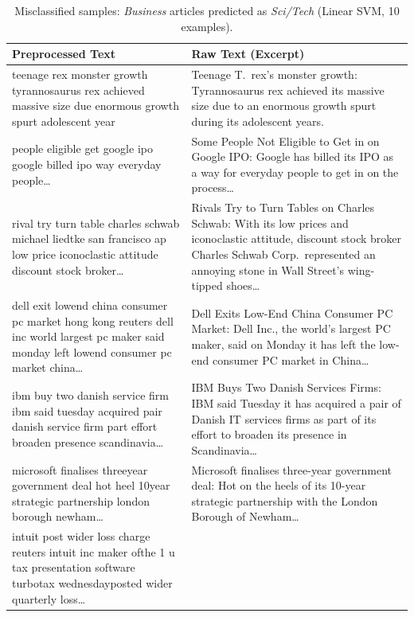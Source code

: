 
\begin{table}[htbp]
\centering
\caption{Misclassified samples: \textit{Business} articles predicted as \textit{Sci/Tech} (Linear SVM, 10 examples).}
\label{tab:error-analysis-biz-to-sci}
\small
\begin{tabular}{p{0.6\textheight} p{0.6\textheight}}
\toprule
\textbf{Preprocessed Text} & \textbf{Raw Text (Excerpt)} \\
\midrule
teenage rex monster growth tyrannosaurus rex achieved massive size due enormous growth spurt adolescent year &
Teenage T.\ rex's monster growth: Tyrannosaurus rex achieved its massive size due to an enormous growth spurt during its adolescent years. \\
\addlinespace
people eligible get google ipo google billed ipo way everyday people\ldots &
Some People Not Eligible to Get in on Google IPO: Google has billed its IPO as a way for everyday people to get in on the process\ldots \\
\addlinespace
rival try turn table charles schwab michael liedtke san francisco ap low price iconoclastic attitude discount stock broker\ldots &
Rivals Try to Turn Tables on Charles Schwab: With its low prices and iconoclastic attitude, discount stock broker Charles Schwab Corp.\ represented an annoying stone in Wall Street's wing-tipped shoes\ldots \\
\addlinespace
dell exit lowend china consumer pc market hong kong reuters dell inc world largest pc maker said monday left lowend consumer pc market china\ldots &
Dell Exits Low-End China Consumer PC Market: Dell Inc., the world's largest PC maker, said on Monday it has left the low-end consumer PC market in China\ldots \\
\addlinespace
ibm buy two danish service firm ibm said tuesday acquired pair danish service firm part effort broaden presence scandinavia\ldots &
IBM Buys Two Danish Services Firms: IBM said Tuesday it has acquired a pair of Danish IT services firms as part of its effort to broaden its presence in Scandinavia\ldots \\
\addlinespace
microsoft finalises threeyear government deal hot heel 10year strategic partnership london borough newham\ldots &
Microsoft finalises three-year government deal: Hot on the heels of its 10-year strategic partnership with the London Borough of Newham\ldots \\
\addlinespace
intuit post wider loss charge reuters intuit inc maker ofthe 1 u tax presentation software turbotax wednesdayposted wider quarterly loss\ldots &

\end{tabular}
\end{table}
